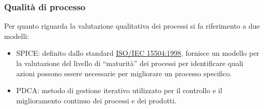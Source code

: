 \documentclass[a4paper,11pt]{article}
\begin{document}
\subsubsection{Qualità di processo}
Per quanto riguarda la valutazione qualitativa dei processi si fa riferimento a due modelli: 
\begin{itemize}
\item SPICE\addglos : definito dallo standard \underline{ISO/IEC 15504:1998}, fornisce un modello per la valutazione del livello di “maturità”
dei processi per identificare quali azioni possono essere necessarie per migliorare un processo specifico.
\item PDCA\addglos : metodo di gestione iterativo utilizzato per il controllo e il miglioramento continuo dei processi e dei prodotti. 
\end{itemize}

\end{document}
